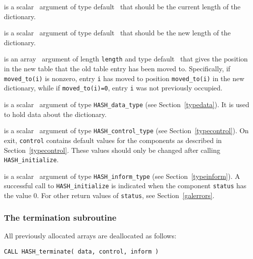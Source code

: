 \documentclass{galahad}
\newcommand{\packagename}{HASH}
\begin{document}
\vspace*{-2mm}
\begin{description}

 is a scalar \intentin\ argument of type default \integer\ that
should be the current length of the dictionary.

 is a scalar \intentin\ argument of type default \integer\
that should be the new length of the dictionary.

 is an array \intentout\ argument of length {\tt length} and
type default \integer\ that gives the position in the new table
that the old table entry has been moved to. Specifically, if
{\tt moved\_to(i)} is nonzero, entry {\tt i} has moved to position
{\tt moved\_to(i)} in the new dictionary, while if {\tt moved\_to(i)=0},
entry {\tt i} was not previously occupied.

 is a scalar \intentinout\ argument of type
{\tt \packagename\_data\_type}
(see Section~\ref{typedata}). It is used to hold data about the dictionary.

 is a scalar \intentin\ argument of type
{\tt \packagename\_control\_type}
(see Section~\ref{typecontrol}).
On exit, {\tt control} contains default values for the components as
described in Section~\ref{typecontrol}.
These values should only be changed after calling
{\tt \packagename\_initialize}.

 is a scalar \intentinout\ argument of type
{\tt \packagename\_inform\_type}
(see Section~\ref{typeinform}). A successful call to
{\tt \packagename\_initialize}
is indicated when the  component {\tt status} has the value 0.
For other return values of {\tt status}, see Section~\ref{galerrors}.

\end{description}


\subsubsection{The  termination subroutine}
All previously allocated arrays are deallocated as follows:
\vspace*{1mm}

\hspace{8mm}
{\tt CALL \packagename\_terminate( data, control, inform )}
\end{document}
